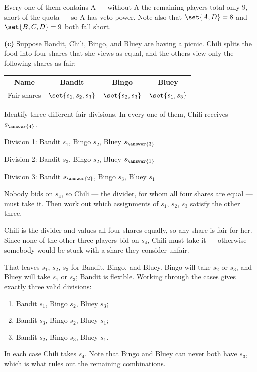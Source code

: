 \documentclass[12pt]{ximera}
\begin{document}
\begin{problem}
\begin{prompt}
\begin{feedback}
Every one of them contains A --- without A the remaining players total only $9$, short of
the quota --- so A has veto power. Note also that $\set{A,D}=8$ and $\set{B,C,D}=9$ both
fall short.
\end{feedback}
\end{prompt}

\begin{prompt}
\textbf{(c)} Suppose Bandit, Chili, Bingo, and Bluey are having a picnic. Chili splits
the food into four shares that she views as equal, and the others view only the following
shares as fair:

\begin{center}
\begin{tabular}{c|ccc}
Name & Bandit & Bingo & Bluey \\\hline
Fair shares & $\set{s_1, s_2, s_3}$ & $\set{s_2, s_3}$ & $\set{s_1, s_3}$
\end{tabular}
\end{center}

Identify three different fair divisions. In every one of them, Chili receives
$s_{\answer{4}}$.

\smallskip
Division 1: Bandit $s_1$, Bingo $s_2$, Bluey $s_{\answer{3}}$

\smallskip
Division 2: Bandit $s_3$, Bingo $s_2$, Bluey $s_{\answer{1}}$

\smallskip
Division 3: Bandit $s_{\answer{2}}$, Bingo $s_3$, Bluey $s_1$

\begin{hint}
Nobody bids on $s_4$, so Chili --- the divider, for whom all four shares are equal --- must
take it. Then work out which assignments of $s_1$, $s_2$, $s_3$ satisfy the other three.
\end{hint}

\begin{feedback}
Chili is the divider and values all four shares equally, so any share is fair for her.
Since none of the other three players bid on $s_4$, Chili must take it --- otherwise
somebody would be stuck with a share they consider unfair.

That leaves $s_1$, $s_2$, $s_3$ for Bandit, Bingo, and Bluey. Bingo will take $s_2$ or
$s_3$, and Bluey will take $s_1$ or $s_3$; Bandit is flexible. Working through the cases
gives exactly three valid divisions:
\begin{enumerate}
\item Bandit $s_1$, Bingo $s_2$, Bluey $s_3$;
\item Bandit $s_3$, Bingo $s_2$, Bluey $s_1$;
\item Bandit $s_2$, Bingo $s_3$, Bluey $s_1$.
\end{enumerate}
In each case Chili takes $s_4$. Note that Bingo and Bluey can never both have $s_3$, which
is what rules out the remaining combinations.
\end{feedback}
\end{prompt}
\end{problem}
\end{document}
